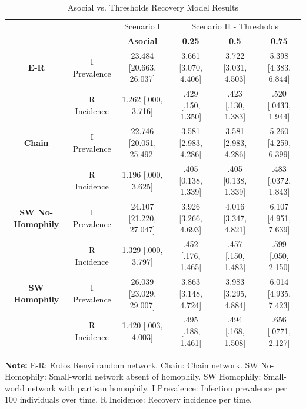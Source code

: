 \documentclass[man, 12pt, a4paper, nolmodern, noextraspace]{apa6}
\begin{document}
\begin{table}
  \centering
    \caption{\\ Asocial vs. Thresholds Recovery Model Results} 
  \label{tab:Table5} 
\begin{tabular}{cccccc}
 \toprule
       \multicolumn{1}{c}{} &  \multicolumn{1}{c}{} & 
      \multicolumn{1}{c}{Scenario I} &
      \multicolumn{3}{c}{Scenario II - Thresholds} \\
\cline{4-6}
 &   & \textbf{Asocial} & \textbf{0.25} & \textbf{0.5} & \textbf{0.75} \\
  \midrule
               \textbf{E-R} & I Prevalence & 23.484 [20.663, 26.037] & 3.661 [3.070, 4.406] & 3.722 [3.031, 4.503] & 5.398 [4.383, 6.844] \\ 
                            & R Incidence & 1.262 [.000, 3.716] & .429 [.150, 1.350] & .423 [.130, 1.383] & .520 [.0433, 1.944] \\ 
             \textbf{Chain} & I Prevalence & 22.746 [20.051, 25.492] & 3.581 [2.983, 4.286] & 3.581 [2.983, 4.286] & 5.260 [4.259, 6.399] \\ 
                            & R Incidence & 1.196 [.000, 3.625] & .405 [0.138, 1.339] & .405 [0.138, 1.339] & .483 [.0372, 1.843] \\ 
   \textbf{SW No-Homophily} & I Prevalence & 24.107 [21.220, 27.047] & 3.926 [3.266, 4.693] & 4.016 [3.347, 4.821] & 6.107 [4.951, 7.639] \\ 
                  & R Incidence & 1.329 [.000, 3.797] & .452 [.176, 1.465] & .457 [.150, 1.483] & .599 [.050, 2.150] \\ 
      \textbf{SW Homophily} & I Prevalence & 26.039 [23.029, 29.007] & 3.863 [3.148, 4.724] & 3.983 [3.295, 4.884] & 6.014 [4.935, 7.423] \\ 
                  & R Incidence & 1.420 [.003, 4.003] & .495 [.188, 1.461] & .494 [.168, 1.508] & .656 [.0771, 2.127] \\ 
   \bottomrule
\end{tabular}
\begin{tablenotes}
\small \vspace{0.15in}
\textbf{Note:} E-R: Erdos Renyi random network. Chain: Chain network. SW No-Homophily: Small-world network absent of homophily. SW Homophily: Small-world network with partisan homophily. I Prevalence: Infection prevalence per 100 individuals over time. R Incidence: Recovery incidence per time. \\ 
\end{tablenotes}
\end{table} 
\end{document}
